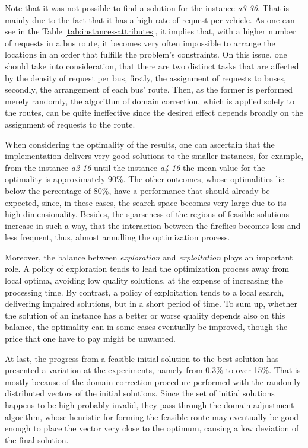 \documentclass[tuberlin,cic,tc,openright,english,noabntcite,oneside]{iiufrgs}
\begin{document}
Note that it was not possible to find a solution for the instance \emph{a3-36}. That is mainly due to the fact that it has a high rate of request per vehicle. As one can see in the Table \ref{tab:instances-attributes}, it implies that, with a higher number of requests in a bus route, it becomes very often impossible to arrange the locations in an order that fulfills the problem's constraints. On this issue, one should take into consideration, that there are two distinct tasks that are affected by the density of request per bus, firstly, the assignment of requests to buses, secondly, the arrangement of each bus' route. Then, as the former is performed merely randomly, the algorithm of domain correction, which is applied solely to the routes, can be quite ineffective since the desired effect depends broadly on the assignment of requests to the route.

When considering the optimality of the results, one can ascertain that the implementation delivers very good solutions to the smaller instances, for example, from the instance \emph{a2-16} until the instance \emph{a4-16} the mean value for the optimality is approximately 90\%. The other outcomes, whose optimalities lie below the percentage of 80\%, have a performance that should already be expected, since, in these cases, the search space becomes very large due to its high dimensionality. Besides, the sparseness of the regions of feasible solutions increase in such a way, that the interaction between the fireflies becomes less and less frequent, thus, almost annulling the optimization process.

Moreover, the balance between \emph{exploration} and \emph{exploitation} plays an important role. A policy of exploration tends to lead the optimization process away from local optima, avoiding low quality solutions, at the expense of increasing the processing time. By contrast, a policy of exploitation tends to a local search, delivering impaired solutions, but in a short period of time. To sum up, whether the solution of an instance has a better or worse quality depends also on this balance, the optimality can in some cases eventually be improved, though the price that one have to pay might be unwanted.

At last, the progress from a feasible initial solution to the best solution has presented a variation at the experiments, namely from 0.3\% to over 15\%. That is mostly because of the domain correction procedure performed with the randomly distributed vectors of the initial solutions. Since the set of initial solutions happens to be high probably invalid, they pass through the domain adjustment algorithm, whose heuristic for forming the feasible route may eventually be good enough to place the vector very close to the optimum, causing a low deviation of the final solution.
\end{document}
